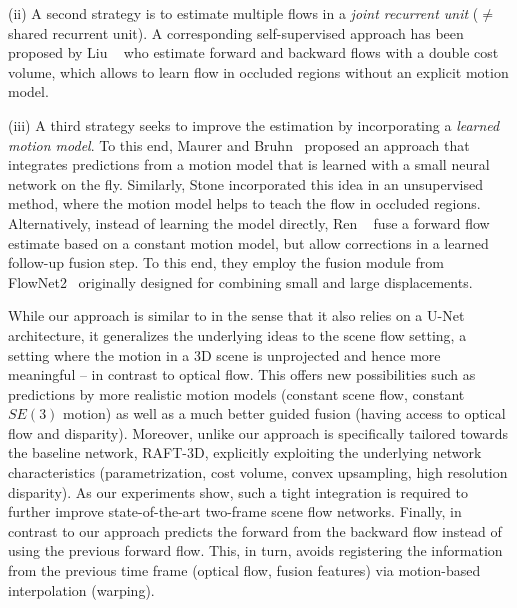 \documentclass[10pt,twocolumn,letterpaper]{article}
\begin{document}
(ii) A second strategy is to estimate multiple flows in a {\em joint recurrent unit} ($\neq$ shared recurrent unit). A corresponding self-supervised approach has been proposed by Liu \etal~\cite{Liu2019_SelfSupervisedOpticalFlow} who estimate forward and backward flows with a double cost volume, which allows to learn flow in occluded regions without an explicit motion model.

(iii) A third  strategy seeks to improve the estimation by incorporating a \emph{learned motion model}. 
To this end, Maurer and Bruhn~\cite{Maurer2018_ProFlow} proposed an approach that integrates predictions from a motion model that is learned with a small neural network on the fly. Similarly, Stone \etal \cite{Stone2021_UnsupOpticalFlow} incorporated this idea in an unsupervised method, where the motion model helps to teach the flow in occluded regions. Alternatively, instead of learning the model directly, Ren \etal~\cite{Ren2019_FlowTemporalFusion} fuse a forward flow estimate based on a constant motion model, but allow corrections in a learned follow-up fusion step. To this end, they employ the fusion module from FlowNet2~\cite{Ilg2017_Flownet2} originally designed for combining small and large displacements.





While our approach is similar to \cite{Ren2019_FlowTemporalFusion} in the sense that it also relies on a U-Net architecture, it generalizes the underlying ideas to the scene flow setting, \ie a setting where the motion in a 3D scene is unprojected and hence more meaningful -- in contrast to optical flow.
This offers new possibilities such as predictions by more realistic motion models (constant scene flow, constant $SE(3)$ motion) as well as a much better guided fusion (having access to optical flow and disparity). 
Moreover, unlike \cite{Ren2019_FlowTemporalFusion, Stone2021_UnsupOpticalFlow} our approach is specifically tailored towards the baseline network, \ie RAFT-3D, explicitly exploiting the underlying network characteristics (parametrization, cost volume, convex upsampling, high resolution disparity). 
As our experiments show, such a tight integration is required to further improve state-of-the-art two-frame scene flow networks.
Finally, in contrast to \cite{Ren2019_FlowTemporalFusion} our approach predicts
the forward from the backward flow 
instead of using the previous forward flow. 
This, in turn, avoids registering the information from the previous time frame (optical flow, fusion features) via motion-based interpolation (warping).
\end{document}
